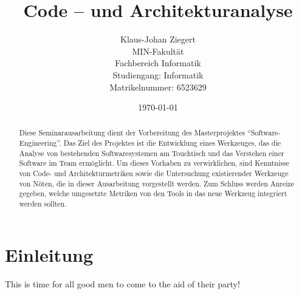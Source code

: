 \documentclass[12pt]{article}
\title{Code -- und Architekturanalyse}
\author{
        Klaus-Johan Ziegert\\
        MIN-Fakultät\\
        Fachbereich Informatik\\
        Studiengang: Informatik\\
        Matrikelnummer: 6523629\\
}
\date{\today}
\begin{document}
\maketitle
\begin{abstract}
        Diese Seminarausarbeitung dient der Vorbereitung des
        Masterprojektes ``Software-Engineering''. Das Ziel des
        Projektes ist die Entwicklung eines Werkzeuges, das die
        Analyse von bestehenden Softwaresystemen am Touchtisch
        und das Verstehen einer Software im Team ermöglicht. Um
        dieses Vorhaben zu verwirklichen, sind Kenntnisse von
        Code- und Architekturmetriken sowie die Untersuchung
        existierender Werkzeuge von Nöten, die in dieser
        Ausarbeitung vorgestellt werden.  Zum Schluss werden
        Anreize gegeben, welche umgesetzte Metriken von den Tools
        in das neue Werkzeug integriert werden sollten.
\end{abstract}

\newpage

\tableofcontents

\newpage

\section{Einleitung}
This is time for all good men to come to the aid of their party!

\end{document}
